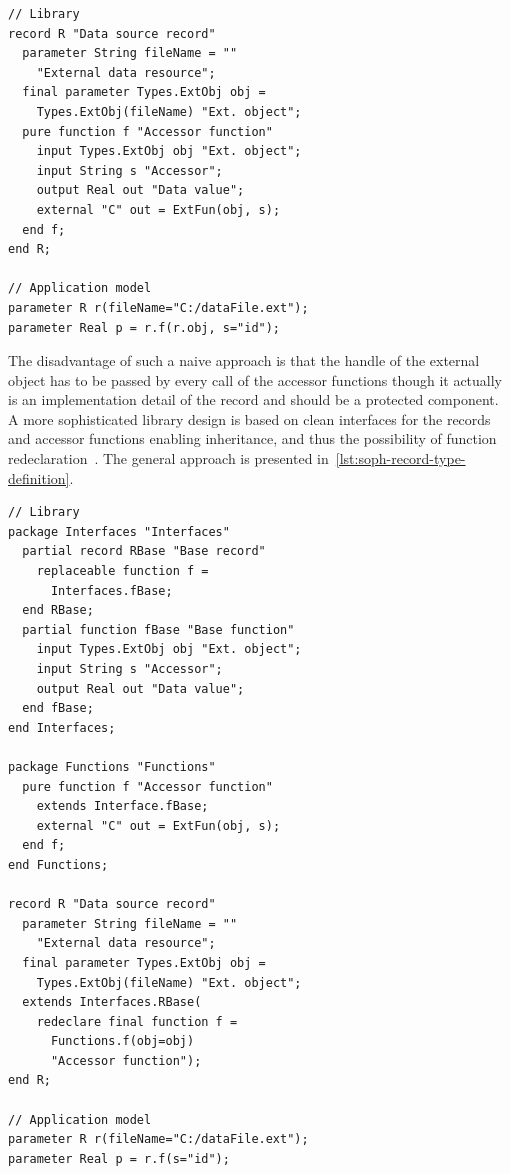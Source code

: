 \documentclass{modelica}
\begin{document}
\begin{lstlisting}[caption=Naive record type definition, label=lst:naive-record-type-definition, language=modelica]
// Library
record R "Data source record"
  parameter String fileName = ""
    "External data resource";
  final parameter Types.ExtObj obj =
    Types.ExtObj(fileName) "Ext. object";
  pure function f "Accessor function"
    input Types.ExtObj obj "Ext. object";
    input String s "Accessor";
    output Real out "Data value";
    external "C" out = ExtFun(obj, s);
  end f;
end R;

// Application model
parameter R r(fileName="C:/dataFile.ext");
parameter Real p = r.f(r.obj, s="id");
\end{lstlisting}

The disadvantage of such a naive approach is that the handle of the external object has to be passed by every call of the accessor functions though it actually is an implementation detail of the record and should be a protected component.
A more sophisticated library design is based on clean interfaces for the records and accessor functions enabling inheritance, and thus the possibility of function redeclaration~\cite{modelisax2018hints}.
The general approach is presented in~\autoref{lst:soph-record-type-definition}.

\begin{lstlisting}[caption=Sophisticated record type definition, label=lst:soph-record-type-definition, language=modelica]
// Library
package Interfaces "Interfaces"
  partial record RBase "Base record"
    replaceable function f =
      Interfaces.fBase;
  end RBase;
  partial function fBase "Base function"
    input Types.ExtObj obj "Ext. object";
    input String s "Accessor";
    output Real out "Data value";
  end fBase;
end Interfaces;

package Functions "Functions"
  pure function f "Accessor function"
    extends Interface.fBase;
    external "C" out = ExtFun(obj, s);
  end f;
end Functions;

record R "Data source record"
  parameter String fileName = ""
    "External data resource";
  final parameter Types.ExtObj obj =
    Types.ExtObj(fileName) "Ext. object";
  extends Interfaces.RBase(
    redeclare final function f =
      Functions.f(obj=obj)
      "Accessor function");
end R;

// Application model
parameter R r(fileName="C:/dataFile.ext");
parameter Real p = r.f(s="id");
\end{lstlisting}
\end{document}
